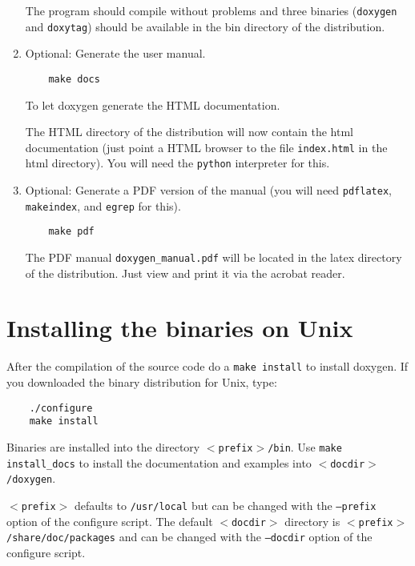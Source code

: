 \begin{enumerate}
The program should compile without problems and three binaries ({\tt doxygen} and {\tt doxytag}) should be available in the bin directory of the distribution.

\item Optional: Generate the user manual.



\footnotesize\begin{verbatim}
    make docs
\end{verbatim}
\normalsize


To let doxygen generate the HTML documentation.

The HTML directory of the distribution will now contain the html documentation (just point a HTML browser to the file {\tt index.html} in the html directory). You will need the {\tt python} interpreter for this.

\item Optional: Generate a PDF version of the manual (you will need {\tt pdflatex}, {\tt makeindex}, and {\tt egrep} for this).



\footnotesize\begin{verbatim}
    make pdf
\end{verbatim}
\normalsize


The PDF manual {\tt doxygen\_\-manual.pdf} will be located in the latex directory of the distribution. Just view and print it via the acrobat reader.

\end{enumerate}
\hypertarget{install_install_bin_unix}{}\section{Installing the binaries on Unix}\label{install_install_bin_unix}
After the compilation of the source code do a {\tt make install} to install doxygen. If you downloaded the binary distribution for Unix, type:



\footnotesize\begin{verbatim}
    ./configure
    make install
\end{verbatim}
\normalsize


Binaries are installed into the directory {\tt $<$prefix$>$/bin}. Use {\tt make install\_\-docs} to install the documentation and examples into {\tt $<$docdir$>$/doxygen}.

{\tt $<$prefix$>$} defaults to {\tt /usr/local} but can be changed with the {\tt --prefix} option of the configure script. The default {\tt $<$docdir$>$} directory is {\tt $<$prefix$>$/share/doc/packages} and can be changed with the {\tt --docdir} option of the configure script.

